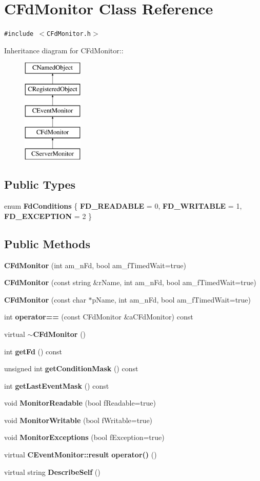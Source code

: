 \section{CFd\-Monitor  Class Reference}
\label{classCFdMonitor}
{\tt \#include $<$CFd\-Monitor.h$>$}

Inheritance diagram for CFd\-Monitor::\begin{figure}[H]
\begin{center}
\leavevmode
\includegraphics[height=5cm]{classCFdMonitor}
\end{center}
\end{figure}
\subsection*{Public Types}
\begin{CompactItemize}
\item 
enum {\bf Fd\-Conditions} \{ {\bf FD\_\-READABLE} = 0, 
{\bf FD\_\-WRITABLE} = 1, 
{\bf FD\_\-EXCEPTION} = 2
 \}
\end{CompactItemize}
\subsection*{Public Methods}
\begin{CompactItemize}
\item 
{\bf CFd\-Monitor} (int am\_\-n\-Fd, bool am\_\-f\-Timed\-Wait=true)
\item 
{\bf CFd\-Monitor} (const string \&r\-Name, int am\_\-n\-Fd, bool am\_\-f\-Timed\-Wait=true)
\item 
{\bf CFd\-Monitor} (const char $\ast$p\-Name, int am\_\-n\-Fd, bool am\_\-f\-Timed\-Wait=true)
\item 
int {\bf operator==} (const CFd\-Monitor \&a\-CFd\-Monitor) const
\item 
virtual {\bf $\sim$CFd\-Monitor} ()
\item 
int {\bf get\-Fd} () const
\item 
unsigned int {\bf get\-Condition\-Mask} () const
\item 
int {\bf get\-Last\-Event\-Mask} () const
\item 
void {\bf Monitor\-Readable} (bool f\-Readable=true)
\item 
void {\bf Monitor\-Writable} (bool f\-Writable=true)
\item 
void {\bf Monitor\-Exceptions} (bool f\-Exception=true)
\item 
virtual {\bf CEvent\-Monitor::result} {\bf operator()} ()
\item 
virtual string {\bf Describe\-Self} ()
\end{CompactItemize}
